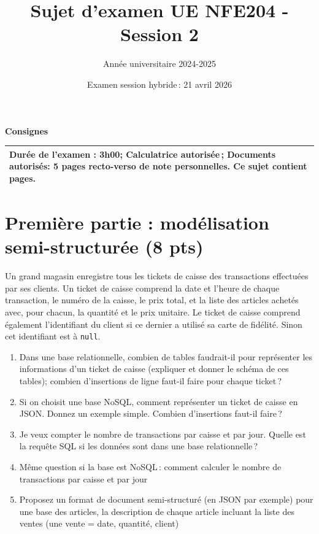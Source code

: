 \documentclass[11pt,a4paper]{article}
\begin{document}
\title{Sujet d'examen UE NFE204 - Session 2}
\author{Année universitaire 2024-2025}
\date{Examen session hybride\,: 21 avril 2026}

\maketitle

\begin{center}
{\bf \Large Consignes}\\
\begin{tabular}{| p{15cm} |}
\hline
Dur\'ee de l'examen : 3h00; Calculatrice autoris\'ee\,; Documents autorisés: 5 pages recto-verso de note personnelles.
Ce sujet contient \pageref{LastPage} pages.\\
\hline
\end{tabular}
\end{center}


\section*{Première partie : modélisation semi-structurée (8 pts)}

Un grand magasin enregistre tous les tickets de caisse des transactions effectuées par ses clients.
Un ticket de caisse comprend la date et l'heure de chaque transaction, le numéro de la caisse, le prix total,
et la liste des articles achetés avec, pour chacun, la quantité et le prix unitaire.  Le ticket de caisse comprend également
l'identifiant du client si ce dernier a utilisé sa carte de fidélité. Sinon cet identifiant
est à \texttt{null}.


\begin{enumerate}
  \item Dans une base relationnelle, combien de tables faudrait-il pour représenter 
         les informations d'un ticket de caisse (expliquer et donner le schéma de ces tables); combien d'insertions de ligne
             faut-il faire pour chaque ticket\,?
    \item Si on choisit une base NoSQL, comment représenter un ticket de caisse en JSON.
        Donnez un exemple simple. Combien d'insertions faut-il faire\,?
   \item Je veux compter le nombre de transactions par caisse et par jour.  Quelle est la requête SQL si les données
       sont dans une base relationnelle\,?
    \item Même question si la base est NoSQL\,: comment calculer le nombre de transactions par caisse et par jour
    \item Proposez un format de document semi-structuré (en JSON par exemple) pour une base
         des articles, la description de chaque article incluant la liste des ventes (une vente = date,
         quantité, client)
 \end{enumerate}
\end{document}
